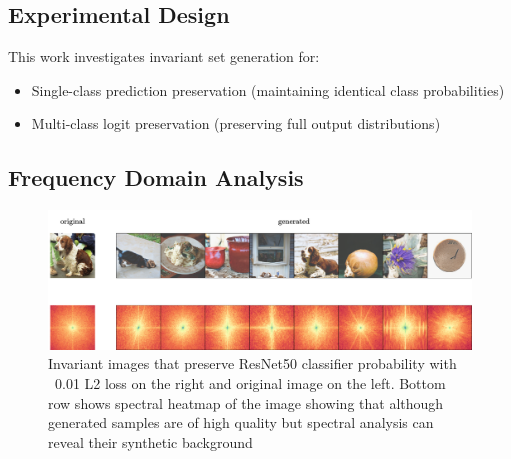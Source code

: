 \documentclass[licencjacka,en]{pracamgr}
\begin{document}
\subsection{Experimental Design}

This work investigates invariant set generation for:
\begin{itemize}
\item Single-class prediction preservation (maintaining identical class probabilities)
\item Multi-class logit preservation (preserving full output distributions)  
\end{itemize}

\subsection{Frequency Domain Analysis}

\begin{figure}[h]
\centering
\includegraphics[width=\linewidth]{figures/main/spectral_analysis_1.png}
\caption{Invariant images that preserve ResNet50 classifier probability with ~0.01 L2 loss on the right and original image on the left. Bottom row shows spectral heatmap of the image showing that although generated samples are of high quality but spectral analysis can reveal their synthetic background}
\label{fig:frequency_analysis_1}
\end{figure}
\end{document}
